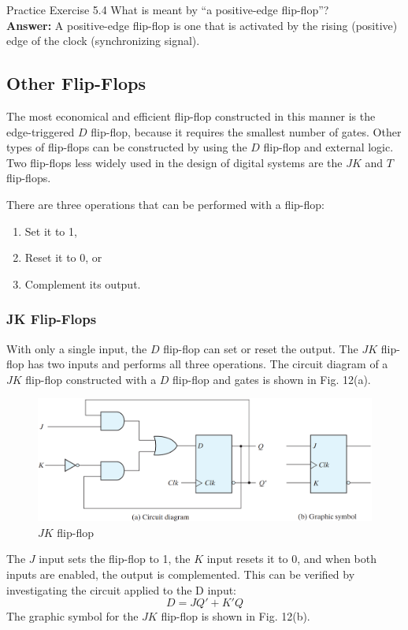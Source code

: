 \begin{practice}{Practice Exercise 5.4}
\noindent What is meant by ``a positive-edge flip-flop''?\\

\textbf{Answer:} A positive-edge flip-flop is one that is activated by the rising (positive) edge of the clock (synchronizing signal).
\end{practice}

\subsection{Other Flip-Flops}
\label{subsec:other-flip-flops}

The most economical and efficient flip-flop constructed in this manner is the edge-triggered $D$ flip-flop, because it requires the smallest number of gates. Other types of flip-flops can be constructed by using the $D$ flip-flop and external logic. Two flip-flops less widely used in the design of digital systems are the $JK$ and $T$ flip-flops.

There are three operations that can be performed with a flip-flop:
\begin{enumerate}[]
  \item Set it to 1,
  \item Reset it to 0, or 
  \item Complement its output.
\noindent \end{enumerate}

\subsubsection{JK Flip-Flops}
\label{subsubsec:jk-flip-flops}

With only a single input, the $D$ flip-flop can set or reset the output. The $JK$ flip-flop has two inputs and performs all three operations. The circuit diagram of a $JK$ flip-flop constructed with a $D$ flip-flop 
and gates is shown in Fig. 12(a).
\begin{figure}[H]
  \centering
  \includegraphics[width=\linewidth]{img/fig-5.12.png}
  \caption{$JK$ flip-flop}
  \label{fig:5.12}
\end{figure}
\noindent The $J$ input sets the flip-flop to 1, the $K$ input resets it 
to 0, and when both inputs are enabled, the output is complemented. This can be verified by investigating the circuit applied to the D input:
\begin{equation*}
  D = JQ' + K'Q
\end{equation*}
The graphic symbol for the $JK$ flip-flop is shown in Fig. 12(b).

